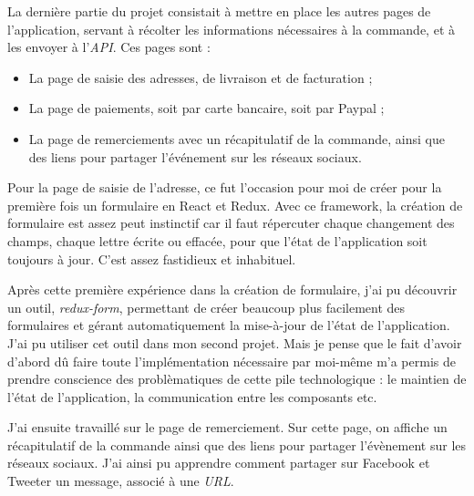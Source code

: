 \documentclass[12pt,a4paper]{article}
\providecommand{\tightlist}{%
  \setlength{\itemsep}{0pt}\setlength{\parskip}{0pt}}
\begin{document}
  \bigskip

  La dernière partie du projet consistait à mettre en place les autres
  pages de l'application, servant à récolter les informations nécessaires
  à la commande, et à les envoyer à l'\emph{API}. Ces pages sont :

  \begin{itemize}
  \tightlist
  \item
    La page de saisie des adresses, de livraison et de facturation ;
  \item
    La page de paiements, soit par carte bancaire, soit par Paypal ;
  \item
    La page de remerciements avec un récapitulatif de la commande, ainsi
    que des liens pour partager l'événement sur les réseaux sociaux.
  \end{itemize}

  \bigskip

  Pour la page de saisie de l'adresse, ce fut l'occasion pour moi de créer
  pour la première fois un formulaire en React et Redux. Avec ce
  framework, la création de formulaire est assez peut instinctif car il
  faut répercuter chaque changement des champs, chaque lettre écrite ou
  effacée, pour que l'état de l'application soit toujours à jour. C'est
  assez fastidieux et inhabituel.

  \bigskip

  Après cette première expérience dans la création de formulaire, j'ai pu
  découvrir un outil, \emph{redux-form}, permettant de créer beaucoup plus
  facilement des formulaires et gérant automatiquement la mise-à-jour de
  l'état de l'application. J'ai pu utiliser cet outil dans mon second
  projet. Mais je pense que le fait d'avoir d'abord dû faire toute
  l'implémentation nécessaire par moi-même m'a permis de prendre
  conscience des problèmatiques de cette pile technologique : le maintien
  de l'état de l'application, la communication entre les composants etc.

  \bigskip

  J'ai ensuite travaillé sur le page de remerciement. Sur cette page, on
  affiche un récapitulatif de la commande ainsi que des liens pour
  partager l'évènement sur les réseaux sociaux. J'ai ainsi pu apprendre
  comment partager sur Facebook et Tweeter un message, associé à une
  \emph{URL}.

  \bigskip
\end{document}
